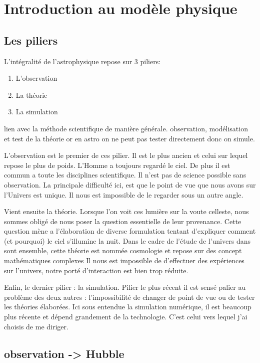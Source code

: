 \chapter{Introduction au modèle physique }\label{ch:introduction}

\section{Les piliers}

L'intégralité de l'astrophysique repose sur 3 piliers:
\begin{enumerate}
\item L'observation
\item La théorie
\item La simulation
\end{enumerate}

lien avec la méthode scientifique de manière générale. observation, modélisation et test de la théorie or en astro on ne peut pas tester directement donc on simule.

L'observation est le premier de ces pilier. 
Il est le plus ancien et celui sur lequel repose le plus de poids.
L'Homme a toujours regardé le ciel.
De plus il est commun a toute les disciplines scientifique.
Il n'est pas de science possible sans observation.
La principale difficulté ici, est que le point de vue que nous avons sur l'Univers est unique. 
Il nous est impossible de le regarder sous un autre angle.

Vient ensuite la théorie.
Lorsque l'on voit ces lumière sur la voute celleste, nous sommes obligé de nous poser la question essentielle de leur provenance.
Cette question mène a l'élaboration de diverse formulation tentant d'expliquer comment (et pourquoi) le ciel s'illumine la nuit.  
Dans le cadre de l'étude de l'univers dans sont ensemble, cette théorie est nommée cosmologie et repose sur des concept mathématiques complexes
Il nous est impossible de d'effectuer des expériences sur l'univers, notre porté d'interaction est bien trop réduite.

Enfin, le dernier pilier : la simulation.
Pilier le plus récent il est sensé palier au problème des deux autres : l'impossibilité de changer de point de vue ou de tester les théories élaborées.
Ici sous entendue la simulation numérique, il est beaucoup plus récente et dépend grandement de la technologie.
C'est celui vers lequel j'ai choisis de me diriger.

\section{observation -> Hubble}

